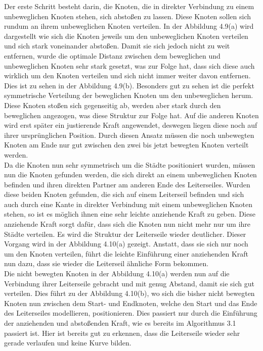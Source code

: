 Der erste Schritt besteht darin, die Knoten, die in direkter Verbindung zu einem unbeweglichen Knoten stehen, sich abstoßen zu lassen. Diese Knoten sollen sich rundum an ihrem unbeweglichen Knoten verteilen. In der Abbildung 4.9(a) wird dargestellt wie sich die Knoten jeweils um den unbeweglichen Knoten verteilen und sich stark voneinander abstoßen. Damit sie sich jedoch nicht zu weit entfernen, wurde die optimale Distanz zwischen dem beweglichen und unbeweglichen Knoten sehr stark gesetzt, was zur Folge hat, dass sich diese auch wirklich um den Knoten verteilen und sich nicht immer weiter davon entfernen. Dies ist zu sehen in der Abbildung 4.9(b). Besonders gut zu sehen ist die perfekt symmetrische Verteilung der beweglichen Knoten um den unbeweglichen herum. Diese Knoten stoßen sich gegenseitig ab, werden aber stark durch den beweglichen angezogen, was diese Struktur zur Folge hat. Auf die anderen Knoten wird erst später ein justierende Kraft angewendet, deswegen liegen diese noch auf ihrer ursprünglichen Position. Durch diesen Ansatz müssen die noch unbewegten Knoten am Ende nur gut zwischen den zwei bis jetzt bewegten Knoten verteilt werden.\\


Da die Knoten nun sehr symmetrisch um die Städte positioniert wurden, müssen nun die Knoten gefunden werden, die sich direkt an einem unbeweglichen Knoten befinden und ihren direkten Partner am anderen Ende des Leiterseiles. Wurden diese beiden Knoten gefunden, die sich auf einem Leiterseil befinden und sich auch durch eine Kante in direkter Verbindung mit einem unbeweglichen Knoten stehen, so ist es möglich ihnen eine sehr leichte anziehende Kraft zu geben. Diese anziehende Kraft sorgt dafür, dass sich die Knoten nun nicht mehr nur um ihre Städte verteilen. Es wird die Struktur der Leiterseile wieder deutlicher. Dieser Vorgang wird in der Abbildung 4.10(a) gezeigt. Anstatt, dass sie sich nur noch um den Knoten verteilen, führt die leichte Einführung einer anziehenden Kraft nun dazu, dass sie wieder die Leiterseil ähnliche Form bekommen.\\

Die nicht bewegten Knoten in der Abbildung 4.10(a) werden nun auf die Verbindung ihrer Leiterseile gebracht und mit genug Abstand, damit sie sich gut verteilen. Dies führt zu der Abbildung 4.10(b), wo sich die bisher nicht bewegten Knoten nun zwischen dem Start- und Endknoten, welche den Start und das Ende des Leiterseiles modellieren, positionieren. Dies passiert nur durch die Einführung der anziehenden und abstoßenden Kraft, wie es bereits im Algorithmus 3.1 passiert ist. Hier ist bereits gut zu erkennen, dass die Leiterseile wieder sehr gerade verlaufen und keine Kurve bilden. \\

